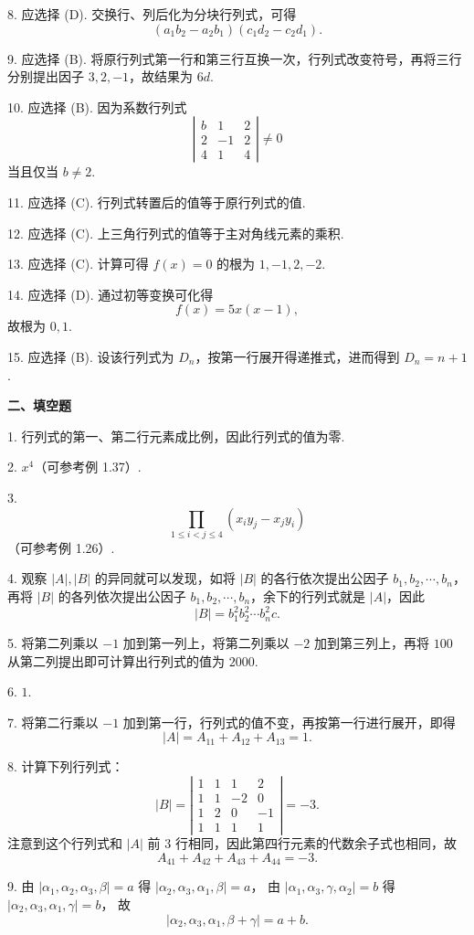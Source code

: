 \documentclass[UTF8, 12pt, fontset=fandol, oneside]{ctexart}
\begin{document}
8. 应选择 (D). 交换行、列后化为分块行列式，可得
\[
(a_1b_2-a_2b_1)(c_1d_2-c_2d_1).
\]

9. 应选择 (B). 将原行列式第一行和第三行互换一次，行列式改变符号，再将三行分别提出因子 $3,2,-1$，故结果为 $6d$.

10. 应选择 (B). 因为系数行列式
\[
\left|\begin{array}{ccc}
b&1&2\\
2&-1&2\\
4&1&4
\end{array}\right|\ne0
\]
当且仅当 $b\ne2$.

11. 应选择 (C). 行列式转置后的值等于原行列式的值.

12. 应选择 (C). 上三角行列式的值等于主对角线元素的乘积.

13. 应选择 (C). 计算可得 $f(x)=0$ 的根为 $1,-1,2,-2$.

14. 应选择 (D). 通过初等变换可化得
\[
f(x)=5x(x-1),
\]
故根为 $0,1$.

15. 应选择 (B). 设该行列式为 $D_n$，按第一行展开得递推式，进而得到 $D_n=n+1$.

\noindent\textbf{二、填空题}

1. 行列式的第一、第二行元素成比例，因此行列式的值为零.

2. $x^4$（可参考例 1.37）.

3. 
\[
\prod_{1\le i<j\le4}(x_iy_j-x_jy_i)
\]
（可参考例 1.26）.

4. 观察 $|A|,|B|$ 的异同就可以发现，如将 $|B|$ 的各行依次提出公因子 $b_1,b_2,\cdots,b_n$，
再将 $|B|$ 的各列依次提出公因子 $b_1,b_2,\cdots,b_n$，余下的行列式就是 $|A|$，因此
\[
|B|=b_1^2b_2^2\cdots b_n^2c.
\]

5. 将第二列乘以 $-1$ 加到第一列上，将第二列乘以 $-2$ 加到第三列上，再将 $100$ 从第二列提出即可计算出行列式的值为 $2000$.

6. $1$.

7. 将第二行乘以 $-1$ 加到第一行，行列式的值不变，再按第一行进行展开，即得
\[
|A|=A_{11}+A_{12}+A_{13}=1.
\]

8. 计算下列行列式：
\[
|B|=\left|\begin{array}{cccc}
1&1&1&2\\
1&1&-2&0\\
1&2&0&-1\\
1&1&1&1
\end{array}\right|=-3.
\]
注意到这个行列式和 $|A|$ 前 $3$ 行相同，因此第四行元素的代数余子式也相同，故
\[
A_{41}+A_{42}+A_{43}+A_{44}=-3.
\]

9. 由 $|\alpha_1,\alpha_2,\alpha_3,\beta|=a$ 得 $|\alpha_2,\alpha_3,\alpha_1,\beta|=a$，
由 $|\alpha_1,\alpha_3,\gamma,\alpha_2|=b$ 得 $|\alpha_2,\alpha_3,\alpha_1,\gamma|=b$，
故
\[
|\alpha_2,\alpha_3,\alpha_1,\beta+\gamma|=a+b.
\]
\end{document}
